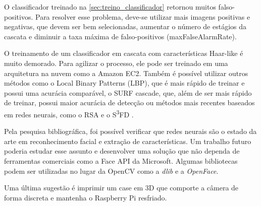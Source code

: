 O classificador treinado na \autoref{sec:treino_classificador} retornou muitos falso-positivos. Para resolver esse problema, deve-se utilizar mais imagens positivas e negativas, que devem ser bem selecionadas, aumentar o número de estágios da cascata e diminuir a taxa máxima de falso-positivos (maxFalseAlarmRate).

O treinamento de um classificador em cascata com características Haar-like é muito demorado. Para agilizar o processo, ele pode ser treinado em uma arquitetura na nuvem como a Amazon EC2.
Também é possível utilizar outros métodos como o Local Binary Patterns (LBP), que é mais rápido de treinar e possui uma acurácia comparável, o SURF cascade, que, além de ser mais rápido de treinar, possui maior acurácia de detecção \cite{li2013learning, fddbTech} ou métodos mais recentes baseados em redes neurais, como o RSA \cite{liu2017recurrent} e o S\textsuperscript{3}FD \cite{zhang2017s}.

Pela pesquisa bibliográfica, foi possível verificar que redes neurais são o estado da arte em reconhecimento facial e extração de características. Um trabalho futuro poderia estudar esse assunto e desenvolver uma solução que não dependa de ferramentas comerciais como a Face API da Microsoft. Algumas bibliotecas podem ser utilizadas no lugar da OpenCV como a \textit{dlib} e a \textit{OpenFace}.

Uma última sugestão é imprimir um case em 3D que comporte a câmera de forma discreta e mantenha o Raspberry Pi resfriado.
